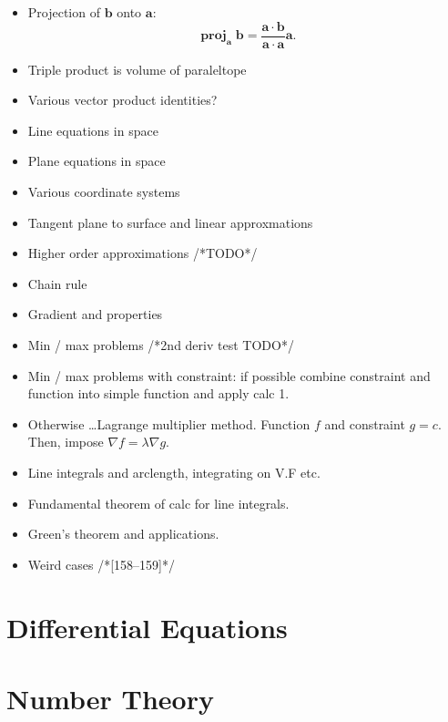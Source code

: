 \documentclass[12pt]{amsart}
\DeclareMathOperator{\proj}{\mathbf{proj}}
\begin{document}
\begin{multicols}{2}
\begin{itemize}
    \item Projection of $ \mathbf{b}$ onto $ \mathbf{a}$:
    \begin{equation*}
            \proj_{\mathbf{a}}\mathbf{b} = \frac{ \mathbf{a} \cdot \mathbf{b}} { \mathbf{a} \cdot \mathbf{a}} \mathbf{a}.
    \end{equation*}
    \item Triple product is volume of paraleltope
    \item Various vector product identities?
    \item Line equations in space
    \item Plane equations in space
    \item Various coordinate systems
    \item Tangent plane to surface and linear approxmations
    \item Higher order approximations /*TODO*/
    \item Chain rule
    \item Gradient and properties
    \item Min / max problems /*2nd deriv test TODO*/
    \item Min / max problems with constraint: if possible combine constraint and function into simple function and apply calc 1.
    \item Otherwise \dots Lagrange multiplier method. Function $f$ and constraint $g = c$. Then, impose $\nabla f = \lambda \nabla g$.
    \item Line integrals and arclength, integrating on V.F etc.
    \item Fundamental theorem of calc for line integrals.
    \item Green's theorem and applications.
    \item Weird cases /*[158--159]*/
\end{itemize}
\section{Differential Equations}%
\label{sec:differential_equations}

\section{Number Theory}%
\label{sec:number_theory}


\end{multicols}
\end{document}
